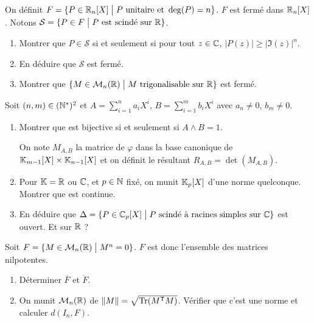 \begin{exercise}
	On définit $F=\{P\in\mathbb{R}_n[X]\bigm| P\text{ unitaire et }\deg(P)=n\}$. $F$ est fermé dans $\mathbb{R}_{n}[X]$. Notons $\mathcal{S}=\{P\in F\bigm| P\text{ est scindé sur }\mathbb{R}\}$.
	\begin{enumerate}
		\item Montrer que $P\in\mathcal{S}$ si et seulement si pour tout $z\in\mathbb{C}$, $\vert P(z)\vert\geqslant \vert\Im(z)\vert^{n}$.
		\item En déduire que $\mathcal{S}$ est fermé.
		\item Montrer que $\{M\in\mathcal{M}_{n}(\mathbb{R})\bigm| M\text{ trigonalisable sur }\mathbb{R}\}$ est fermé.
	\end{enumerate}
\end{exercise}

\begin{exercise}
	Soit $(n,m)\in(\mathbb{N}^{*})^{2}$ et $A=\sum_{i=1}^{n}a_{i}X^{i}$, $B=\sum_{i=1}^{m}b_{i}X^{i}$ avec $a_{n}\neq 0$, $b_{m}\neq0$.
	\begin{enumerate}
		\item Montrer que 
		est bijective si et seulement si $A\wedge B=1$.

		On note $M_{A,B}$ la matrice de $\varphi$ dans la base canonique de $\mathbb{K}_{m-1}[X]\times\mathbb{K}_{n-1}[X]$ et on définit le résultant $R_{A,B}=\det(M_{A,B})$.
		\item Pour $\mathbb{K}=\mathbb{R}$ ou $\mathbb{C}$, et $p\in\mathbb{N}$ fixé, on munit $\mathbb{K}_{p}[X]$ d'une norme quelconque. Montrer que 
		est continue.
		\item En déduire que $\Delta=\{P\in\mathbb{C}_{p}[X]\bigm| P\text{ scindé à racines simples sur }\mathbb{C}\}$ est ouvert. Et sur $\mathbb{R}$ ?
	\end{enumerate}
\end{exercise}

\begin{exercise}
	Soit $F=\{M\in\mathcal{M}_{n}(\mathbb{R})\bigm|M^{n}=0\}$. $F$ est donc l'ensemble des matrices nilpotentes.
	\begin{enumerate}
		\item Déterminer $\overline{F}$ et $\mathring{F}$.
		\item On munit $\mathcal{M}_{n}(\mathbb{R})$ de $\Vert M\Vert=\sqrt{\operatorname{Tr}(M^{\mathsf{T}}M)}$. Vérifier que c'est une norme et calculer $d(I_{n},F)$.
	\end{enumerate}
\end{exercise}


